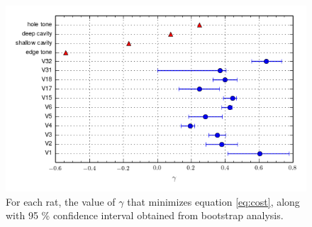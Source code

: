 \documentclass[twocolumn, prl]{revtex4}
\begin{document}
\begin{figure}
\begin{center}
\includegraphics[width=\columnwidth]{gamma_error.png}
\caption{\label{fig:gamma_error}For each rat, the value of $\gamma$ that minimizes equation \ref{eq:cost}, along with 95 \% confidence interval obtained from bootstrap analysis.} \end{center}
\end{figure}


\end{document}
